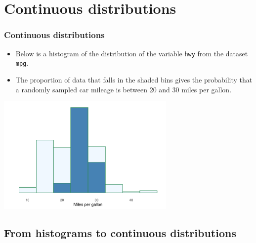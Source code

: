 \documentclass[notes,11pt, aspectratio=169]{beamer}
\begin{document}

\section{Continuous distributions}


\begin{frame}
\frametitle{Continuous distributions}

\begin{itemize}

\item Below is a histogram of the distribution of the variable \texttt{hwy} from the dataset \texttt{mpg}. 

\item The proportion of data that falls in the shaded bins gives the probability that a randomly sampled car mileage is between 20 and 30 miles per gallon.

\end{itemize}

\begin{center}
\includegraphics[width=0.65\textwidth]{graphs/l03f03}
\end{center}


\end{frame}


\subsection{From histograms to continuous distributions}
\end{document}
